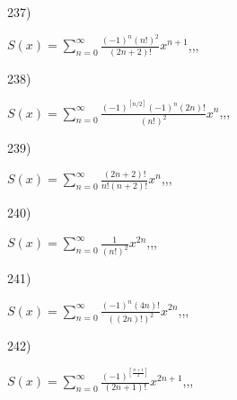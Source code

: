 \documentclass[11pt, ukrainian]{article}
\begin{document}
\par
\vspace{0.9cm}
237) \space 
{%
{$S(x)=\sum\limits_{n=0}^{\infty}{\frac{{(-1)^n}{(n!)^2}}{(2n+2)!}}{x^{{n+1}}}$},,, \par \smallskip  
}
\par
\vspace{0.9cm}
238) \space 
{%
{$S(x)=\sum\limits_{n=0}^{\infty}{\frac{{(-1)^{[n/2]}}{(-1)^n}(2n)!}{(n!)^2}}{x^{n}}$},,, \par \smallskip  
}
\par
\vspace{0.9cm}
239) \space 
{%
{$S(x)=\sum\limits_{n=0}^{\infty}{\frac{(2n+2)!}{n!(n+2)!}}{x^{n}}$},,, \par \smallskip  
}
\par
\vspace{0.9cm}
240) \space 
{%
{$S(x)=\sum\limits_{n=0}^{\infty}{\frac{1}{(n!)^2}}{x^{{2n}}}$},,, \par \smallskip  
}
\par
\newpage
241) \space 
{%
{$S(x)=\sum\limits_{n=0}^{\infty}{\frac{{(-1)^n}(4n)!}{{((2n)!)^2}}}{x^{{2n}}}$},,, \par \smallskip  
}
\par
\vspace{0.9cm}
242) \space 
{%
{$S(x)=\sum\limits_{n=0}^{\infty}{\frac{(-1)^{[\frac{n+1}{2}]}}{(2n+1)!}}{x^{{2n+1}}}$},,, \par \smallskip  
}
\end{document}
